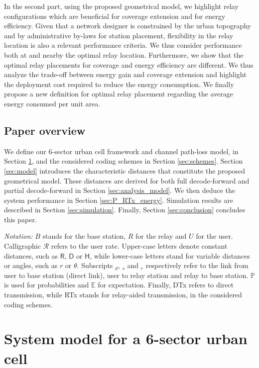 \documentclass[journal]{IEEEtran}
\theoremstyle{definition}
\begin{document}
In the second part, using the proposed geometrical model, we highlight relay configurations which are beneficial for coverage extension and for energy efficiency. Given that a network designer is constrained by the urban topography and by administrative by-laws for station placement, flexibility in the relay location is also a relevant performance criteria. We thus consider performance both at and nearby the optimal relay location. 
Furthermore, we show that the optimal relay placements for coverage and energy efficiency are different. We thus analyze the trade-off between energy gain and coverage extension and highlight the deployment cost required to reduce the energy consumption. We finally propose a new definition for optimal relay placement regarding the average energy consumed per unit area.





\subsection{Paper overview}

We define our 6-sector urban cell framework and channel path-loss model, in Section \ref{sec:system_model}, and the considered coding schemes in Section \ref{sec:schemes}. Section \ref{sec:model} introduces the characteristic distances that constitute the proposed geometrical model. These distances are derived for both full decode-forward and partial decode-forward in Section \ref{sec:analysis_model}. We then deduce the system performance in Section \ref{sec:P_RTx_energy}.
Simulation results are described in Section \ref{sec:simulation}. Finally, Section \ref{sec:conclusion} concludes this paper.


\textit{Notation:} $B$ stands for the base station, $R$ for the relay and $U$ for the user. Calligraphic $\mathcal{R}$ refers to the user rate. Upper-case letters denote constant distances, such as $\mathsf{R}$, $\mathsf{D}$ or $\mathsf{H}$, while lower-case letters stand for variable distances or angles, such as $r$ or $\theta$. Subscripts $_{d}$, $_{s}$ and $_{r}$ respectively refer to the link from user to base station (direct link), user to relay station and relay to base station. $\mathbb{P}$ is used for probabilities and $\mathbb{E}$ for expectation. Finally, DTx refers to direct transmission, while RTx stands for relay-aided transmission, in the considered coding schemes.



\section{System model for a 6-sector urban cell}
\label{sec:system_model}
\end{document}
